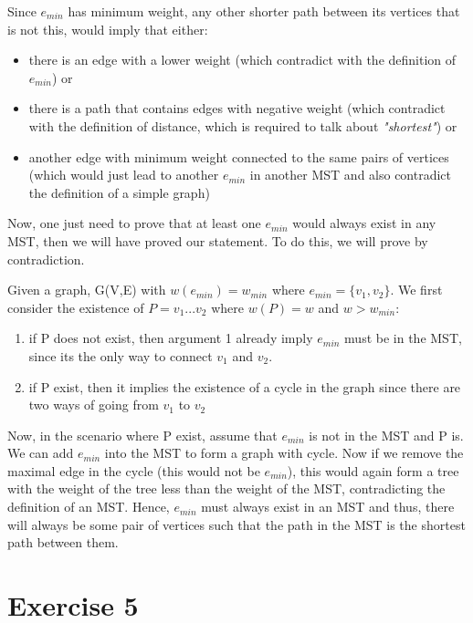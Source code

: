 \documentclass[nobib]{tufte-handout}
\begin{document}
\begin{enumerate}
    Since $e_{min}$ has minimum weight, any other shorter path between its vertices that is not this, would imply that either:
    \begin{itemize}
        \item there is an edge with a lower weight (which contradict with the definition of $e_{min}$) or
        \item there is a path that contains edges with negative weight (which contradict with the definition of distance, which is required to talk about \textit{"shortest"}) or
        \item another edge with minimum weight connected to the same pairs of vertices (which would just lead to another $e_{min}$ in another MST and also contradict the definition of a simple graph)
    \end{itemize}
    Now, one just need to prove that at least one $e_{min}$ would always exist in any MST, then we will have proved our statement. To do this, we will prove by contradiction.
    
    Given a graph, G(V,E) with $w(e_{min}) = w_{min}$ where $e_{min} =\{v_1,v_2\}$. We first consider the existence of $P=v_1 ... v_2$ where $w(P) = w$ and $w > w_{min}$: 
    \begin{enumerate}
        \item if P does not exist, then argument 1 already imply $e_{min}$ must be in the MST, since its the only way to connect $v_1 $ and $ v_2$.
        \item if P exist, then it implies the existence of a cycle in the graph since there are two ways of going from $v_1$ to $v_2$
    \end{enumerate}
    
    Now, in the scenario where P exist, assume that $e_{min}$ is not in the MST and P is. We can add $e_{min}$ into the MST to form a graph with cycle. Now if we remove the maximal edge in the cycle (this would not be $e_{min}$), this would again form a tree with the weight of the tree less than the weight of the MST, contradicting the definition of an MST. Hence, $e_{min}$ must always exist in an MST and thus, there will always be some pair of vertices such that the path in the MST is the shortest path between them.
    
\end{enumerate}
\newpage
\section{Exercise 5}
\end{document}
